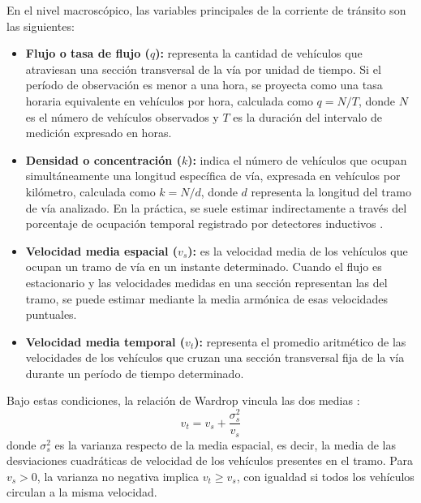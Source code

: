 En el nivel macroscópico, las variables principales de la corriente de tránsito son las siguientes:
\begin{itemize}
    \item \textbf{Flujo o tasa de flujo ($q$):} representa la cantidad de vehículos que atraviesan una sección transversal de la vía por unidad de tiempo. Si el período de observación es menor a una hora, se proyecta como una tasa horaria equivalente en vehículos por hora, calculada como $q = N/T$, donde $N$ es el número de vehículos observados y $T$ es la duración del intervalo de medición expresado en horas.
    \item \textbf{Densidad o concentración ($k$):} indica el número de vehículos que ocupan simultáneamente una longitud específica de vía, expresada en vehículos por kilómetro, calculada como $k = N/d$, donde $d$ representa la longitud del tramo de vía analizado. En la práctica, se suele estimar indirectamente a través del porcentaje de ocupación temporal registrado por detectores inductivos \cite{ite_handbook}.
    \item \textbf{Velocidad media espacial ($v_s$):} es la velocidad media de los vehículos que ocupan un tramo de vía en un instante determinado. Cuando el flujo es estacionario y las velocidades medidas en una sección representan las del tramo, se puede estimar mediante la media armónica de esas velocidades puntuales.
    \item \textbf{Velocidad media temporal ($v_t$):} representa el promedio aritmético de las velocidades de los vehículos que cruzan una sección transversal fija de la vía durante un período de tiempo determinado.
\end{itemize}

Bajo estas condiciones, la relación de Wardrop vincula las dos medias \cite[Ec.~6]{wardrop1952}:
\begin{equation}
    v_t = v_s + \frac{\sigma_s^2}{v_s}
    \label{eq:relacion_wardrop}
\end{equation}
donde $\sigma_s^2$ es la varianza respecto de la media espacial, es decir, la media de las desviaciones cuadráticas de velocidad de los vehículos presentes en el tramo. Para $v_s>0$, la varianza no negativa implica $v_t\ge v_s$, con igualdad si todos los vehículos circulan a la misma velocidad.

